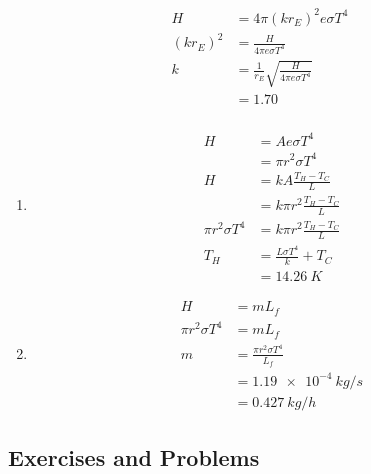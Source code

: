 \documentclass{article}
\begin{document}
\begin{align*}
  H         & = 4 \pi (k r_E)^2 e \sigma T^4                      \\
  (k r_E)^2 & = \frac{H}{4 \pi e \sigma T^4}                      \\
  k         & = \frac{1}{r_E} \sqrt{\frac{H}{4 \pi e \sigma T^4}} \\
            & = 1.70
\end{align*}

\subsubsection{}

\begin{enumerate}
  \item

        \begin{align*}
          H                  & = A e \sigma T^4                \\
                             & = \pi r^2 \sigma T^4            \\
          H                  & = k A \frac{T_H - T_C}{L}       \\
                             & = k \pi r^2 \frac{T_H - T_C}{L} \\
          \pi r^2 \sigma T^4 & = k \pi r^2 \frac{T_H - T_C}{L} \\
          T_H                & = \frac{L \sigma T^4}{k} + T_C  \\
                             & = \qty{14.26}{K}
        \end{align*}

  \item

        \begin{align*}
          H                  & = m L_f                          \\
          \pi r^2 \sigma T^4 & = m L_f                          \\
          m                  & = \frac{\pi r^2 \sigma T^4}{L_f} \\
                             & = \qty{1.19e-4}{kg/s}            \\
                             & = \qty{0.427}{kg/h}
        \end{align*}
\end{enumerate}

\subsection{Exercises and Problems}
\end{document}
